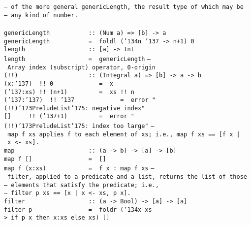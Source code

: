 \mbox{\tt --\ of\ the\ more\ general\ genericLength,\ the\ result\ type\ of\ which\ may\ be}\\
\mbox{\tt --\ any\ kind\ of\ number.}\\
\mbox{\tt }\\[-8pt]
\mbox{\tt genericLength\ \ \ \ \ \ \ \ \ \ \ ::\ (Num\ a)\ =>\ [b]\ ->\ a}\\
\mbox{\tt genericLength\ \ \ \ \ \ \ \ \ \ \ =\ \ foldl\ ({\char'134}n\ {\char'137}\ ->\ n+1)\ 0}
%
\eprogB\noindent\bprogB
\mbox{\tt length\ \ \ \ \ \ \ \ \ \ \ \ \ \ \ \ \ \ ::\ [a]\ ->\ Int}\\
\mbox{\tt length\ \ \ \ \ \ \ \ \ \ \ \ \ \ \ \ \ \ =\ \ genericLength}
%
\eprogB\noindent\bprogB
\mbox{\tt --\ Array\ index\ (subscript)\ operator,\ 0-origin}\\
\mbox{\tt (!!)\ \ \ \ \ \ \ \ \ \ \ \ \ \ \ \ \ \ \ \ ::\ (Integral\ a)\ =>\ [b]\ ->\ a\ ->\ b}\\
\mbox{\tt (x:{\char'137})\ \ !!\ 0\ \ \ \ \ \ \ \ \ \ \ \ \ =\ \ x}\\
\mbox{\tt ({\char'137}:xs)\ !!\ (n+1)\ \ \ \ \ \ \ \ \ =\ \ xs\ !!\ n}\\
\mbox{\tt ({\char'137}:{\char'137})\ \ !!\ {\char'137}\ \ \ \ \ \ \ \ \ \ \ \ \ =\ \ error\ "(!!){\char'173}PreludeList{\char'175}:\ negative\ index"}\\
\mbox{\tt []\ \ \ \ \ !!\ ({\char'137}+1)\ \ \ \ \ \ \ \ \ =\ \ error\ "(!!){\char'173}PreludeList{\char'175}:\ index\ too\ large"}
%
\eprogB\noindent\bprogB
\mbox{\tt --\ map\ f\ xs\ applies\ f\ to\ each\ element\ of\ xs;\ i.e.,\ map\ f\ xs\ ==\ [f\ x\ |\ x\ <-\ xs].}\\
\mbox{\tt map\ \ \ \ \ \ \ \ \ \ \ \ \ \ \ \ \ \ \ \ \ ::\ (a\ ->\ b)\ ->\ [a]\ ->\ [b]}\\
\mbox{\tt map\ f\ []\ \ \ \ \ \ \ \ \ \ \ \ \ \ \ \ =\ \ []}\\
\mbox{\tt map\ f\ (x:xs)\ \ \ \ \ \ \ \ \ \ \ \ =\ \ f\ x\ :\ map\ f\ xs}
%
\eprogB\noindent\bprogB
\mbox{\tt --\ filter,\ applied\ to\ a\ predicate\ and\ a\ list,\ returns\ the\ list\ of\ those}\\
\mbox{\tt --\ elements\ that\ satisfy\ the\ predicate;\ i.e.,}\\
\mbox{\tt --\ filter\ p\ xs\ ==\ [x\ |\ x\ <-\ xs,\ p\ x].}\\
\mbox{\tt filter\ \ \ \ \ \ \ \ \ \ \ \ \ \ \ \ \ \ ::\ (a\ ->\ Bool)\ ->\ [a]\ ->\ [a]}\\
\mbox{\tt filter\ p\ \ \ \ \ \ \ \ \ \ \ \ \ \ \ \ =\ \ foldr\ ({\char'134}x\ xs\ ->\ if\ p\ x\ then\ x:xs\ else\ xs)\ []}
